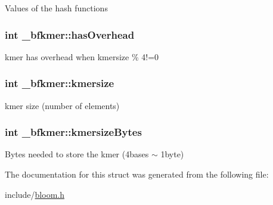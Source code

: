 Values of the hash functions \hypertarget{struct__bfkmer_a78787413a5bdf782f32ff66a8f21be20}{
\subsubsection[{has\+Overhead}]{\setlength{\rightskip}{0pt plus 5cm}int \+\_\+bfkmer\+::has\+Overhead}}\label{struct__bfkmer_a78787413a5bdf782f32ff66a8f21be20}
kmer has overhead when kmersize \% 4!=0 \hypertarget{struct__bfkmer_aec3b3cd33fdfbd71f38b7c9a21a00574}{
\subsubsection[{kmersize}]{\setlength{\rightskip}{0pt plus 5cm}int \+\_\+bfkmer\+::kmersize}}\label{struct__bfkmer_aec3b3cd33fdfbd71f38b7c9a21a00574}
kmer size (number of elements) \hypertarget{struct__bfkmer_aad605c14068200c97520fcd6e49f3e7c}{
\subsubsection[{kmersize\+Bytes}]{\setlength{\rightskip}{0pt plus 5cm}int \+\_\+bfkmer\+::kmersize\+Bytes}}\label{struct__bfkmer_aad605c14068200c97520fcd6e49f3e7c}
Bytes needed to store the kmer (4bases $\sim$ 1byte) 

The documentation for this struct was generated from the following file\+:\begin{DoxyCompactItemize}
\item 
include/\hyperlink{bloom_8h}{bloom.\+h}\end{DoxyCompactItemize}
